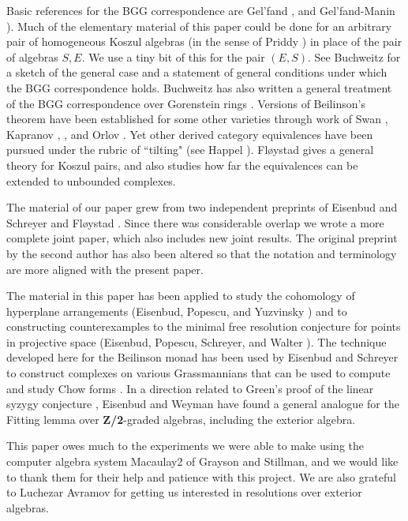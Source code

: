 \documentclass{tran-l}
\theoremstyle{plain}
\theoremstyle{remark}
\theoremstyle{definition}
\begin{document}
Basic references for the BGG correspondence are
Gel'fand \cite{Gel},
and Gel'fand-Manin \cite{GM}).
Much of the elementary material of this paper could be done for an
arbitrary pair of homogeneous Koszul algebras (in the sense of Priddy
\cite{Pri}) in place of the pair of algebras $S, E$. We use a tiny bit of
this for the pair $(E,S)$.  See Buchweitz \cite{Buc1} for a sketch of the
general case and a statement of general conditions under which the BGG
correspondence holds. Buchweitz has also written
a general treatment of the BGG correspondence over
Gorenstein rings \cite{Buc2}.  Versions of
Beilinson's theorem have been established for some other varieties
through work of Swan \cite{Swa}, Kapranov \cite{Kap1}, \cite{Kap2}, 
and Orlov \cite{Orl}.  Yet
other derived category equivalences have been pursued under the rubric of
``tilting" (see Happel \cite{Hap}). Fl\o ystad \cite{Flo1} gives a general
theory for Koszul pairs, and also studies how far the equivalences
can be extended to unbounded complexes.

The material of our paper grew from two independent preprints of
Eisenbud and Schreyer \cite{ES1} and Fl\o ystad \cite{Flo2}. Since there was
considerable overlap we wrote a more complete joint paper,
which also includes new joint results.  The original preprint by the
second author has also been altered so that the notation and
terminology are more aligned with the present paper.

The material in this paper has been applied to study the
cohomology of hyperplane arrangements (Eisenbud, Popescu, and
Yuzvinsky \cite{EPY}) and to constructing counterexamples to the minimal
free resolution conjecture for points in projective space (Eisenbud,
Popescu, Schreyer, and Walter \cite{EPSW}).  The technique developed here
for the Beilinson monad has been used by Eisenbud and Schreyer to
construct complexes on various Grassmannians that can be used to
compute and study Chow forms \cite{ES2}.  In a direction related to
Green's proof of the linear syzygy conjecture \cite{EW}, Eisenbud and
Weyman have found a general analogue for the Fitting lemma over {\bf Z/2}-graded algebras, including the exterior algebra.

This paper owes much to the experiments we were able to make
using the computer algebra system Macaulay2 of Grayson and Stillman,
and we would like to thank them for their help and patience with
this project. We are also grateful to Luchezar Avramov for
getting us interested in resolutions over exterior algebras.
\end{document}
